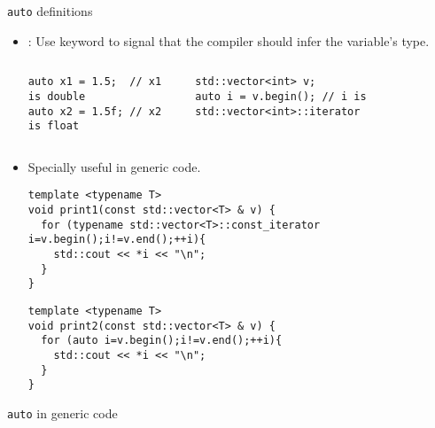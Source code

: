 \begin{frame}[t,fragile]{\texttt{auto} definitions}
\begin{itemize}
  \item {}: 
        Use keyword  to signal that the compiler
        should infer the variable's type.
\pause

\begin{columns}[T]
\begin{lstlisting}
auto x1 = 1.5;  // x1 is double
auto x2 = 1.5f; // x2 is float
\end{lstlisting}

\begin{lstlisting}
std::vector<int> v;
auto i = v.begin(); // i is std::vector<int>::iterator
\end{lstlisting}
\end{columns}

\pause
\item Specially useful in generic code.
\begin{lstlisting}[basicstyle=\tiny]
template <typename T>
void print1(const std::vector<T> & v) {
  for (typename std::vector<T>::const_iterator i=v.begin();i!=v.end();++i){
    std::cout << *i << "\n";
  }
}
\end{lstlisting}
\begin{lstlisting}[basicstyle=\tiny]
template <typename T>
void print2(const std::vector<T> & v) {
  for (auto i=v.begin();i!=v.end();++i){
    std::cout << *i << "\n";
  }
}
\end{lstlisting}
\end{itemize}
\end{frame}

\begin{frame}[t,fragile]{\texttt{auto} in generic code}
\end{frame}


